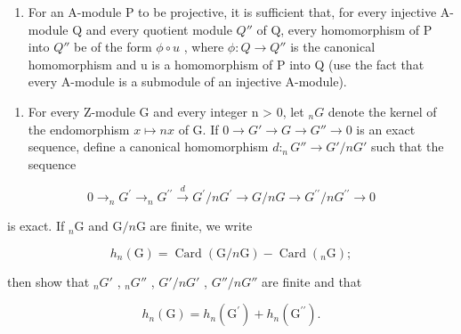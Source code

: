 \begin{enumerate}
\def\labelenumi{(\alph{enumi})}
\setcounter{enumi}{1}
\tightlist
\item
  For an A-module P to be projective, it is sufficient that, for every injective A-module Q and every quotient module \(Q''\) of Q, every homomorphism of P into \(Q''\) be of the form \(\phi \circ u\) , where \(\phi: Q \to Q''\) is the canonical homomorphism and u is a homomorphism of P into Q (use the fact that every A-module is a submodule of an injective A-module).
\end{enumerate}

\begin{enumerate}
\def\labelenumi{\arabic{enumi}.}
\setcounter{enumi}{25}
\tightlist
\item
  For every Z-module G and every integer n \textgreater{} 0, let \(_{n}G\) denote the kernel of the endomorphism \(x \mapsto nx\) of G. If \(0 \to G' \to G \to G'' \to 0\) is an exact sequence, define a canonical homomorphism \(d:_{n}G'' \to G'/nG'\) such that the sequence
\end{enumerate}

\[
0 \longrightarrow_ {n} G ^ {\prime} \longrightarrow_ {n} G ^ {\prime \prime} \stackrel {d} {\longrightarrow} G ^ {\prime} / n G ^ {\prime} \longrightarrow G / n G \longrightarrow G ^ {\prime \prime} / n G ^ {\prime \prime} \longrightarrow 0
\]

is exact. If \(_n\mathrm{G}\) and \(\mathrm{G} / n\mathrm{G}\) are finite, we write

\[
h _ {n} (\mathrm{G}) = \operatorname{Card} (\mathrm{G} / n \mathrm{G}) - \operatorname{Card} (_ {n} \mathrm{G});
\]

then show that \(_{n}G'\) , \(_{n}G''\) , \(G'/nG'\) , \(G''/nG''\) are finite and that

\[
h _ {n} (\mathrm{G}) = h _ {n} \left(\mathrm{G} ^ {\prime}\right) + h _ {n} \left(\mathrm{G} ^ {\prime \prime}\right).
\]

